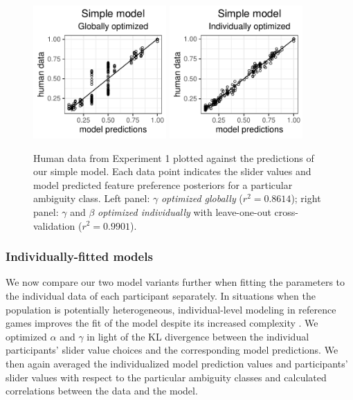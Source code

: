 \documentclass[11pt,a4paper]{article}
\newcommand{\gcs}[1]{\textcolor{blue}{[gcs: #1]}}
\begin{document}
\begin{figure}[ht]
	\centering
	\includegraphics[width=2in]{images/m13.pdf}
	\includegraphics[width=2in]{images/m8.pdf}
		\caption{Human data from Experiment 1 plotted against the predictions of our simple model. %
		Each data point indicates the slider values and model predicted feature preference posteriors for a particular ambiguity class.
		Left panel: $\gamma$ \emph{optimized globally} ($r^2 = 0.8614$); 
		right panel: $\gamma$ and $\beta$ \emph{optimized individually} with leave-one-out cross-validation ($r^{2}=0.9901$).
	}
		\label{simple-global-and-cross-validated}
\end{figure}


\subsubsection{Individually-fitted models}

We now compare our two model variants further when fitting the parameters to the individual data of each participant separately. In situations when the population is potentially heterogeneous, individual-level modeling in reference games improves the fit of the model despite its increased complexity \cite{franke2016reasoning}.
We optimized $\alpha$ and $\gamma$ in light of the KL divergence between the individual participants' slider value choices and the corresponding model predictions.
We then again averaged the individualized model prediction values and participants' slider values with respect to the particular ambiguity classes and calculated correlations between the data and the model.
\end{document}
